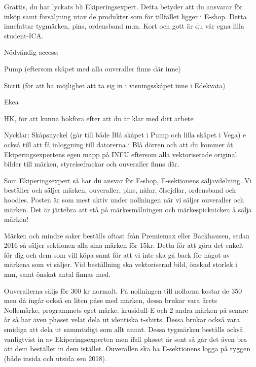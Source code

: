 \documentclass[10pt]{article}
\begin{document}
    \heading{\doctitle}

    Grattis, du har lyckats bli Ekiperingsexpert. Detta betyder att du ansvarar för inköp samt försäljning utav de produkter som för tillfället ligger i E-shop. Detta innefattar tygmärken, pins, ordensband m.m. Kort och gott är du vår egna lilla student-ICA.
    
    Nödvändig access:
    \begin{dashlist}
        \item Pump (eftersom skåpet med alla ouveraller finns där inne)
        \item Sicrit (för att ha möjlighet att ta sig in i visningsskåpet inne i Edekvata)
        \item Ekea
        \item HK, för att kunna bokföra efter att du är klar med ditt arbete
    \end{dashlist}

    Nycklar: Skåpsnyckel (går till både Blå skåpet i Pump och lilla skåpet i Vega)
    e också till att få inloggning till datorerna i Blå dörren och att du kommer åt Ekiperingsexpertens egen mapp på INFU eftersom alla vektoriserade original bilder till märken, styrelsefrackar och ouveraller finns där.

    Som Ekiperingsexpert så har du ansvar för E-shop, E-sektionens säljavdelning. Vi beställer och säljer märken, ouveraller, pins, nålar, ölsejdlar, ordensband och hoodies. Posten är som mest aktiv under nollningen när vi säljer ouveraller och märken. Det är jättebra att stå på märkesmålningen och märkespicknicken å sälja märken!

    Märken och mindre saker beställs oftast från Premiemax eller Backhausen, sedan 2016 så säljer sektionen alla sina märken för 15kr. Detta för att göra det enkelt för dig och dem som vill köpa samt för att vi inte ska gå back för något av märkena som vi säljer. Vid beställning ska vektoriserad bild, önskad storlek i mm, samt önskat antal finnas med.

    Ouverallerna säljs för 300 kr normalt. På nollningen till nollorna kostar de 350 men då ingår också en liten påse med märken, dessa brukar vara årets Nollemärke, programmets eget märke, krusidull-E och 2 andra märken på senare år så har även phøset velat dela ut identiska t-shirts. Dessa brukar också vara smidiga att dela ut sammtidigt som allt annat. Dessa tygmärken beställs också vanligtvist in av Ekiperingsexperten men ifall phøset är sent så går det även bra att dem beställer in dem istället.\newline
    Ouverallen ska ha E-sektionens logga på ryggen (både insida och utsida sen 2018). 
\end{document}
